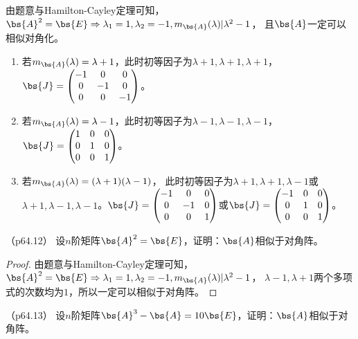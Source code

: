\documentclass[12pt, a4paper, oneside, UTF8]{ctexbook}
\begin{document}
\begin{solution}
    由题意与Hamilton-Cayley定理可知，$\bs{A}^2=\bs{E} \Rightarrow \lambda_1=1,\lambda_2=-1,m_{\bs{A}}(\lambda)|\lambda^2-1$，
    且$\bs{A}$一定可以相似对角化。
    \begin{enumerate}[label=(\arabic*)]
        \item 若$m_{\bs{A}}(\lambda)=\lambda+1$，此时初等因子为$\lambda+1,\lambda+1,\lambda+1$，$\bs{J}=\begin{pmatrix}
            -1 &0 &0\\
            0 &-1 &0\\
            0 &0 &-1
        \end{pmatrix}$。
        \item 若$m_{\bs{A}}(\lambda)=\lambda-1$，此时初等因子为$\lambda-1,\lambda-1,\lambda-1$，$\bs{J}=\begin{pmatrix}
            1 &0 &0\\
            0 &1 &0\\
            0 &0 &1
        \end{pmatrix}$。
        \item 若$m_{\bs{A}}(\lambda)=(\lambda+1)(\lambda-1)$，
        此时初等因子为$\lambda+1,\lambda+1,\lambda-1$或$\lambda+1,\lambda-1,\lambda-1$。$\bs{J}=\begin{pmatrix}
        -1 &0 &0\\
        0 &-1 &0\\
        0 &0 &1
    \end{pmatrix}$或$\bs{J}=\begin{pmatrix}
        -1 &0 &0\\
        0 &1 &0\\
        0 &0 &1
    \end{pmatrix}$。
    \end{enumerate}
\end{solution}

\begin{question}（p64.12）
    设$n$阶矩阵$\bs{A}^2=\bs{E}$，证明：$\bs{A}$相似于对角阵。
\end{question}

\begin{proof}
    由题意与Hamilton-Cayley定理可知，$\bs{A}^2=\bs{E} \Rightarrow \lambda_1=1,\lambda_2=-1,m_{\bs{A}}(\lambda)|\lambda^2-1$，
    $\lambda-1,\lambda+1$两个多项式的次数均为$1$，所以一定可以相似于对角阵。
\end{proof}

\begin{question}（p64.13）
    设$n$阶矩阵$\bs{A}^3-\bs{A}=10\bs{E}$，证明：$\bs{A}$相似于对角阵。
\end{question}
\end{document}
